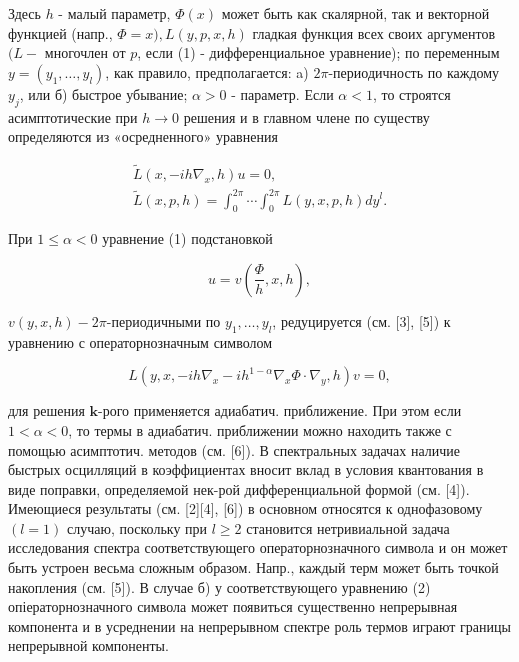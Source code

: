 \documentclass[10pt]{article}
\begin{document}
Здесь $h$ - малый параметр, $\Phi(x)$ может быть как скалярной, так и векторной функцией (напр., $\Phi=x), L(y, p, x, h)$ гладкая функция всех своих аргументов $(L-$ многочлен от $p$, если (1) - дифференциальное уравнение); по переменным $y=\left(y_{1}, \ldots, y_{l}\right)$, как правило, предполагается: a) $2 \pi$-периодичность по каждому $y_{j}$, или б) быстрое убывание; $\alpha>0$ - параметр. Если $\alpha<1$, то строятся асимптотические при $h \rightarrow 0$ решения и в главном члене по существу определяются из «осредненного» уравнения



\[

\begin{gathered}

\tilde{L}\left(x,-i h \nabla_{x}, h\right) u=0, \\

\tilde{L}(x, p, h)=\int_{0}^{2 \pi} \cdots \int_{0}^{2 \pi} L(y, x, p, h) d y^{l} .

\end{gathered}

\]



При $1 \leqslant \alpha<0$ уравнение (1) подстановкой



\[

u=v\left(\frac{\Phi}{h}, x, h\right),

\]



$v(y, x, h)-2 \pi$-периодичными по $y_{1}, \ldots, y_{l}$, редуцируется (см. [3], [5]) к уравнению с операторнозначным символом



\[

L\left(y, x,-i h \nabla_{x}-i h^{1-\alpha} \nabla_{x} \Phi \cdot \nabla_{y}, h\right) v=0,

\]



для решения $\mathbf{k}$-рого применяется адиабатич. приближение. При этом если $1<\alpha<0$, то термы в адиабатич. приближении можно находить также с помощью асимптотич. методов (см. [6]). В спектральных задачах наличие быстрых осцилляций в коэффициентах вносит вклад в условия квантования в виде поправки, определяемой нек-рой дифференциальной формой (см. [4]). Имеющиеся результаты (см. [2][4], [6]) в основном относятся к однофазовому $(l=1)$ случаю, поскольку при $l \geqslant 2$ становится нетривиальной задача исследования спектра соответствующего операторнозначного символа и он может быть устроен весьма сложным образом. Напр., каждый терм может быть точкой накопления (см. [5]). В случае б) у соответствующего уравнению (2) опіераторнозначного символа может появиться существенно непрерывная компонента и в усреднении на непрерывном спектре роль термов играют границы непрерывной компоненты.
\end{document}
